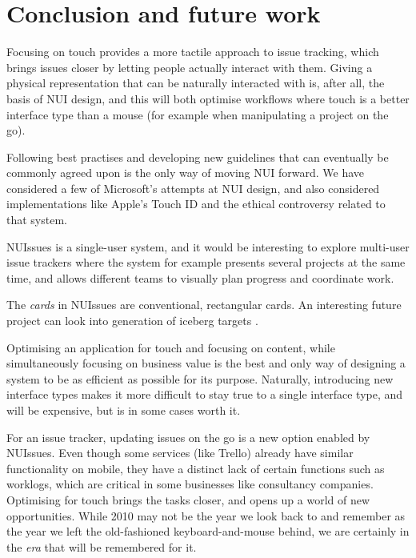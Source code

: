 \section{Conclusion and future work}

Focusing on touch provides a more tactile approach to issue tracking, which brings issues closer by letting people actually interact with them. Giving a physical representation that can be naturally interacted with is, after all, the basis of NUI design, and this will both optimise workflows where touch is a better interface type than a mouse (for example when manipulating a project on the go).

Following best practises and developing new guidelines that can eventually be commonly agreed upon is the only way of moving NUI forward. We have considered a few of Microsoft's attempts at NUI design, and also considered implementations like Apple's Touch ID and the ethical controversy related to that system.

NUIssues is a single-user system, and it would be interesting to explore multi-user issue trackers where the system for example presents several projects at the same time, and allows different teams to visually plan progress and coordinate work.

The \textit{cards} in NUIssues are conventional, rectangular cards. An interesting future project can look into generation of iceberg targets \autocite[91]{wigdow-wixon:brave-nui-world:2011}.

Optimising an application for touch and focusing on content, while simultaneously focusing on business value is the best and only way of designing a system to be as efficient as possible for its purpose. Naturally, introducing new interface types makes it more difficult to stay true to a single interface type, and will be expensive, but is in some cases worth it.

For an issue tracker, updating issues on the go is a new option enabled by NUIssues. Even though some services (like Trello) already have similar functionality on mobile, they have a distinct lack of certain functions such as worklogs, which are critical in some businesses like consultancy companies. Optimising for touch brings the tasks closer, and opens up a world of new opportunities. While 2010 may not be the year we look back to and remember as the year we left the old-fashioned keyboard-and-mouse behind, we are certainly in the \textit{era} that will be remembered for it.
